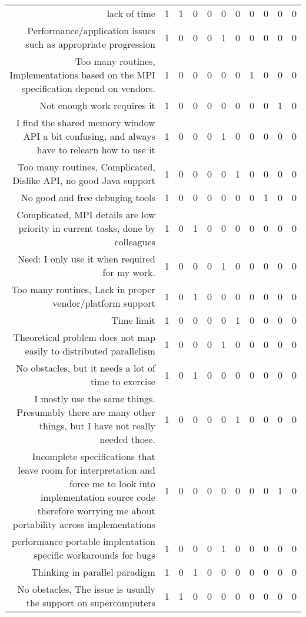 {\begin{landscape}
\begin{longtable}[htb]{r|c|c|c|c|c|c|c|c|c|c}
{lack of time} & 1 & 1 & 0 & 0 & 0 & 0 & 0 & 0 & 0 & 0 \\%
{Performance/application issues such as appropriate progression} & 1 & 0 & 0 & 0 & 1 & 0 & 0 & 0 & 0 & 0 \\%
{Too many routines, Implementations based on the MPI specification depend on vendors.} & 1 & 0 & 0 & 0 & 0 & 0 & 1 & 0 & 0 & 0 \\%
{Not enough work requires it} & 1 & 0 & 0 & 0 & 0 & 0 & 0 & 0 & 1 & 0 \\%
{I find the shared memory window API a bit confusing, and always have to relearn how to use it} & 1 & 0 & 0 & 0 & 1 & 0 & 0 & 0 & 0 & 0 \\%
{Too many routines, Complicated, Dislike API, no good Java support} & 1 & 0 & 0 & 0 & 0 & 1 & 0 & 0 & 0 & 0 \\%
{No good and free debuging tools} & 1 & 0 & 0 & 0 & 0 & 0 & 0 & 1 & 0 & 0 \\%
{Complicated, MPI details are low priority in current tasks, done by colleagues} & 1 & 0 & 1 & 0 & 0 & 0 & 0 & 0 & 0 & 0 \\%
{Need: I only use it when required for my work.} & 1 & 0 & 0 & 0 & 1 & 0 & 0 & 0 & 0 & 0 \\%
{Too many routines, Lack in proper vendor/platform support} & 1 & 0 & 1 & 0 & 0 & 0 & 0 & 0 & 0 & 0 \\%
{Time limit} & 1 & 0 & 0 & 0 & 0 & 1 & 0 & 0 & 0 & 0 \\%
{Theoretical problem does not map easily to distributed parallelism} & 1 & 0 & 0 & 0 & 1 & 0 & 0 & 0 & 0 & 0 \\%
{No obstacles, but it needs a lot of time to exercise} & 1 & 0 & 1 & 0 & 0 & 0 & 0 & 0 & 0 & 0 \\%
{I mostly use the same things.  Presumably there are many other things, but I have not really needed those.} & 1 & 0 & 0 & 0 & 0 & 1 & 0 & 0 & 0 & 0 \\%
{Incomplete specifications that leave room for interpretation and force me to look into implementation source code therefore worrying me about portability across implementations} & 1 & 0 & 0 & 0 & 0 & 0 & 0 & 0 & 1 & 0 \\%
{performance portable  implentation specific workarounds for bugs} & 1 & 0 & 0 & 0 & 1 & 0 & 0 & 0 & 0 & 0 \\%
{Thinking in parallel paradigm} & 1 & 0 & 1 & 0 & 0 & 0 & 0 & 0 & 0 & 0 \\%
{No obstacles, The issue is usually the support on supercomputers} & 1 & 1 & 0 & 0 & 0 & 0 & 0 & 0 & 0 & 0 \\%

\end{longtable}
\end{landscape}}
